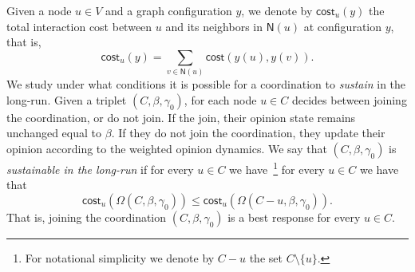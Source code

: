 \documentclass[letterpaper,11pt]{article}
\newcommand{\nsf}{\mathsf{N}}
\newcommand{\cost}{\mathsf{cost}}
\begin{document}
Given a node $u\in V$ and a graph configuration $y$, we denote by $\cost_u(y)$ the total interaction cost between $u$ and its neighbors in $\nsf(u)$ at configuration $y$, that is,
\begin{equation*}
\cost_u(y)=\sum_{v\in \nsf(u)}\cost(y(u),y(v)).
\end{equation*}
We study under what conditions it is possible for a coordination to {\it sustain} in the long-run.
%
Given a triplet $(C,\beta,\gamma_0)$, for each node $u\in C$ decides between joining the coordination, or do not join.
If the join, their opinion state remains unchanged equal to $\beta$.
If they do not join the coordination, they update their opinion according to the weighted opinion dynamics.
We say that $(C,\beta,\gamma_0)$ is {\it sustainable in the long-run} if for every $u\in C$ we have~\footnote{For notational simplicity we denote by $C-u$ the set $C\setminus \{u\}$.} 
for every $u\in C$ we have that
\begin{equation*}
\cost_u(\Omega(C,\beta,\gamma_0))\le \cost_u(\Omega(C-u,\beta,\gamma_0)).
\end{equation*} 
That is, joining the coordination $(C,\beta,\gamma_0)$ is a best response for every $u\in C$.\\
\end{document}
